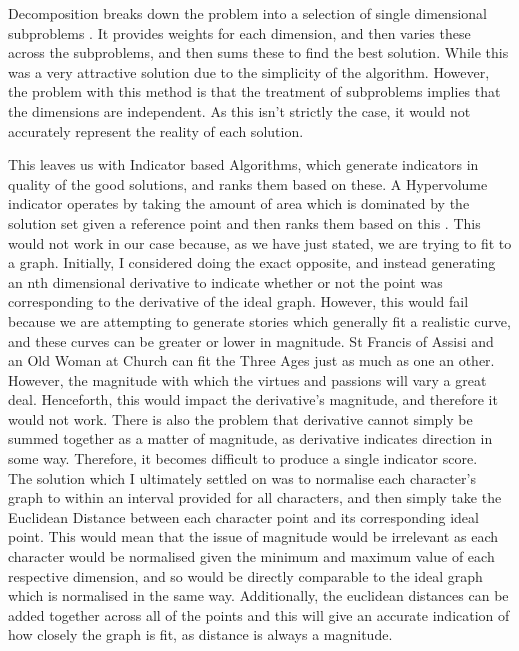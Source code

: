 \documentclass[11pt]{article}
\begin{document}
Decomposition breaks down the problem into a selection of single dimensional subproblems \cite{MOEAD}. It provides weights for each dimension, and then varies these across the subproblems, and then sums these to find the best solution. While this was a very attractive solution due to the simplicity of the algorithm. However, the problem with this method is that the treatment of subproblems implies that the dimensions are independent. As this isn't strictly the case, it would not accurately represent the reality of each solution. 

This leaves us with Indicator based Algorithms, which generate indicators in quality of the good solutions, and ranks them based on these. A Hypervolume indicator operates by taking the amount of area which is dominated by the solution set given a reference point and then ranks them based on this \cite{AchievementScalarazingIndicatorBased}. This would not work in our case because, as we have just stated, we are trying to fit to a graph. Initially, I considered doing the exact opposite, and instead generating an nth dimensional derivative to indicate whether or not the point was corresponding to the derivative of the ideal graph. However, this would fail because we are attempting to generate stories which generally fit a realistic curve, and these curves can be greater or lower in magnitude. St Francis of Assisi and an Old Woman at Church can fit the Three Ages just as much as one an other. However, the magnitude with which the virtues and passions will vary a great deal. Henceforth, this would impact the derivative's magnitude, and therefore it would not work. There is also the problem that derivative cannot simply be summed together as a matter of magnitude, as derivative indicates direction in some way. Therefore, it becomes difficult to produce a single indicator score.  \\

The solution which I ultimately settled on was to normalise each character's graph to within an interval provided for all characters, and then simply take the Euclidean Distance between each character point and its corresponding ideal point. This would mean that the issue of magnitude would be irrelevant as each character would be normalised given the minimum and maximum value of each respective dimension, and so would be directly comparable to the ideal graph which is normalised in the same way. Additionally, the euclidean distances can be added together across all of the points and this will give an accurate indication of how closely the graph is fit, as distance is always a magnitude. 
\end{document}
